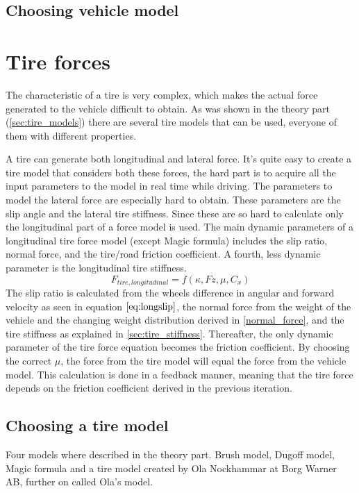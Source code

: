 \subsection{Choosing vehicle model}

\section{Tire forces}
The characteristic of a tire is very complex, which makes the actual force generated to the vehicle difficult to obtain. As was shown in the theory part (\ref{sec:tire_models}) there are several tire models that can be used, everyone of them with different properties.

A tire can generate both longitudinal and lateral force. It's quite easy to create a tire model that considers both these forces, the hard part is to acquire all the input parameters to the model in real time while driving. The parameters to model the lateral force are especially hard to obtain. These parameters are the slip angle and the lateral tire stiffness. Since these are so hard to calculate only the longitudinal part of a force model is used. The main dynamic parameters of a longitudinal tire force model (except Magic formula) includes the slip ratio, normal force, and the tire/road friction coefficient. A fourth, less dynamic parameter is the longitudinal tire stiffness. 
\begin{equation}
F_{tire, longitudinal} = f(\kappa, Fz, \mu, C_{x})
\end{equation}
The slip ratio is calculated from the wheels difference in angular and forward velocity as seen in equation $ \ref{eq:longslip} $, the normal force from the weight of the vehicle and the changing weight distribution derived in \ref{normal_force}, and the tire stiffness as explained in \ref{sec:tire_stiffness}. Thereafter, the only dynamic parameter of the tire force equation becomes the friction coefficient. By choosing the correct $ \mu $, the force from the tire model will equal the force from the vehicle model. This calculation is done in a feedback manner, meaning that the tire force depends on the friction coefficient derived in the previous iteration.

\subsection{Choosing a tire model}
Four models where described in the theory part. Brush model, Dugoff model, Magic formula and a tire model created by Ola Nockhammar at Borg Warner AB, further on called Ola's model.

